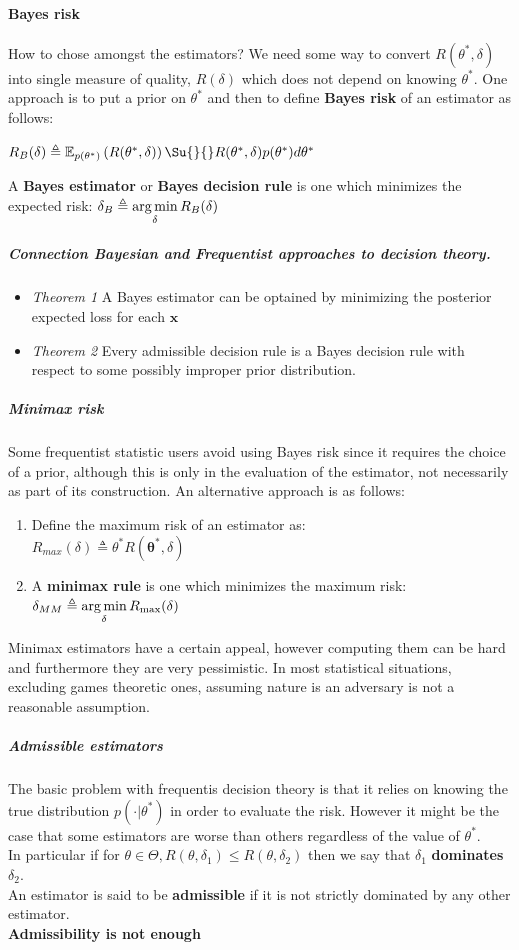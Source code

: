 \paragraph{Bayes risk}
How to chose amongst the estimators? 
We need some way to convert $R(\theta^{*}, \delta)$ into single measure of quality, $R(
\delta)$ which does not depend on knowing $\theta^{*}$. One approach is to put a prior on
$\theta^{*}$ and then to define \textbf{Bayes risk} of an estimator as follows:
\begin{center}
    $R_{B}(\delta) \triangleq \mathbb{E}_{p(\theta^{*})}\left(R(\theta^{*}, \delta)\right)
    \Su{}{}R(\theta^{*}, \delta)p(\theta^{*})d\theta^{*}$
\end{center}
A \textbf{Bayes estimator} or \textbf{Bayes decision rule} is one which minimizes the 
expected risk: $\delta_{B} \triangleq \displaystyle\operatorname*{arg\,min}_{\delta} R_{B}(\delta)$
\subparagraph{Connection Bayesian and Frequentist approaches to decision theory.}
\begin{itemize}
    \item \emph{Theorem 1} A Bayes estimator can be optained by minimizing the posterior 
        expected loss for each $\bm{x}$
    \item \emph{Theorem 2} Every admissible decision rule is a Bayes decision rule with 
        respect to some possibly improper prior distribution.
\end{itemize}
\subparagraph{Minimax risk}
Some frequentist statistic users avoid using Bayes risk since it requires the choice of
a prior, although this is only in the evaluation of the estimator, not necessarily as 
part of its construction. An alternative approach is as follows:
\begin{enumerate}
    \item Define the  maximum risk of an estimator as:\\
        $R_{max}(\delta) \triangleq \displaystyle\theta^{*}R(\bm{\theta}^{*},\delta)$
    \item A \textbf{minimax rule} is one which minimizes the maximum risk:
        $\delta_{MM} \triangleq \displaystyle\operatorname*{arg\,min}_{\delta} R_{\max}(\delta)$
\end{enumerate}
Minimax estimators have a certain appeal, however computing them can be hard and 
furthermore they are very pessimistic.
In most statistical situations, excluding games theoretic ones, assuming nature is an
adversary is not a reasonable assumption.
\subparagraph{Admissible estimators}
The basic problem with frequentis decision theory is that it relies on knowing the true
distribution $p(\cdot|\theta^{*})$ in order to evaluate the risk. However it might be 
the case that some estimators are worse than others regardless of the value of 
$\theta^{*}$.\\
In particular if for $\theta \in \Theta, R(\theta, \delta_{1}) \leq R(\theta, \delta_{2})$
then we say that $\delta_{1}$ \textbf{dominates} $\delta_{2}$.\\
An estimator is said to be \textbf{admissible} if it is not strictly dominated by any 
other estimator.\\
\textbf{Admissibility is not enough}


